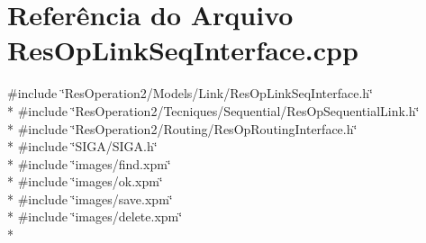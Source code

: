\section{Referência do Arquivo Res\+Op\+Link\+Seq\+Interface.\+cpp}
\label{_res_op_link_seq_interface_8cpp}
{\ttfamily \#include \char`\"{}Res\+Operation2/\+Models/\+Link/\+Res\+Op\+Link\+Seq\+Interface.\+h\char`\"{}}\\*
{\ttfamily \#include \char`\"{}Res\+Operation2/\+Tecniques/\+Sequential/\+Res\+Op\+Sequential\+Link.\+h\char`\"{}}\\*
{\ttfamily \#include \char`\"{}Res\+Operation2/\+Routing/\+Res\+Op\+Routing\+Interface.\+h\char`\"{}}\\*
{\ttfamily \#include \char`\"{}S\+I\+G\+A/\+S\+I\+G\+A.\+h\char`\"{}}\\*
{\ttfamily \#include \char`\"{}images/find.\+xpm\char`\"{}}\\*
{\ttfamily \#include \char`\"{}images/ok.\+xpm\char`\"{}}\\*
{\ttfamily \#include \char`\"{}images/save.\+xpm\char`\"{}}\\*
{\ttfamily \#include \char`\"{}images/delete.\+xpm\char`\"{}}\\*
